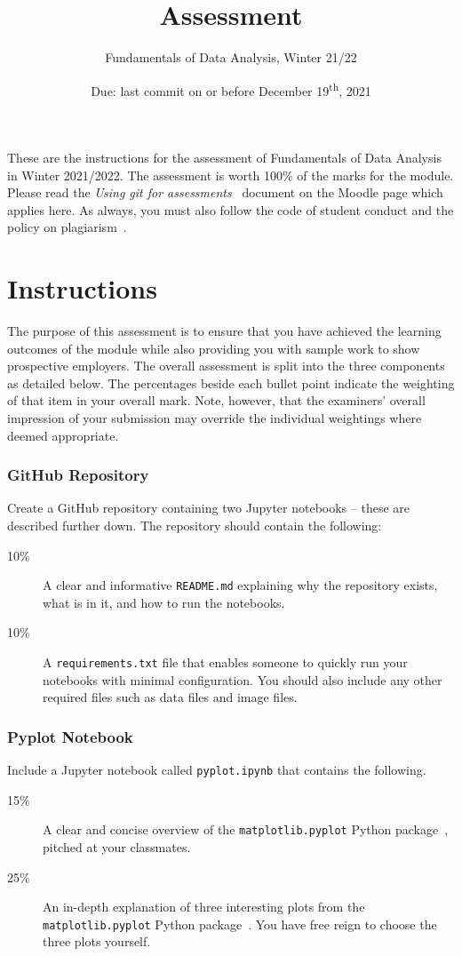 \documentclass[a4paper, 12pt]{scrartcl}
\title{\vspace{-20mm}Assessment}
\author{Fundamentals of Data Analysis, Winter 21/22}
\date{Due: last commit on or before December 19\textsuperscript{th}, 2021\vspace{-6mm}}
\begin{document}
  
  \maketitle

  These are the instructions for the assessment of Fundamentals of Data Analysis in Winter 2021/2022.
  The assessment is worth 100\% of the marks for the module.
  Please read the \emph{Using git for assessments}~\cite{usinggit} document on the Moodle page which applies here.
  As always, you must also follow the code of student conduct and the policy on plagiarism~\cite{gmitqaf}.

  \section*{Instructions}
  
  The purpose of this assessment is to ensure that you have achieved the learning outcomes of the module while also providing you with sample work to show prospective employers.
  The overall assessment is split into the three components as detailed below.
  The percentages beside each bullet point indicate the weighting of that item in your overall mark.
  Note, however, that the examiners' overall impression of your submission may override the individual weightings where deemed appropriate.

  \subsubsection*{GitHub Repository}
  Create a GitHub repository containing two Jupyter notebooks -- these are described further down.
  The repository should contain the following:
  \begin{description}
    \item[10\%] A clear and informative \texttt{README.md} explaining why the repository exists, what is in it, and how to run the notebooks.
    \item[10\%] A \texttt{requirements.txt} file that enables someone to quickly run your notebooks with minimal configuration. You should also include any other required files such as data files and image files.
  \end{description}

  \subsubsection*{Pyplot Notebook}
  Include a Jupyter notebook called \texttt{pyplot.ipynb} that contains the following.
  \begin{description}
    \item[15\%] A clear and concise overview of the \texttt{matplotlib.pyplot} Python package~\cite{pyplot}, pitched at your classmates.
    \item[25\%] An in-depth explanation of three interesting plots from the \texttt{matplotlib.pyplot} Python package~\cite{pyplot}. You have free reign to choose the three plots yourself.
  \end{description}
\end{document}
